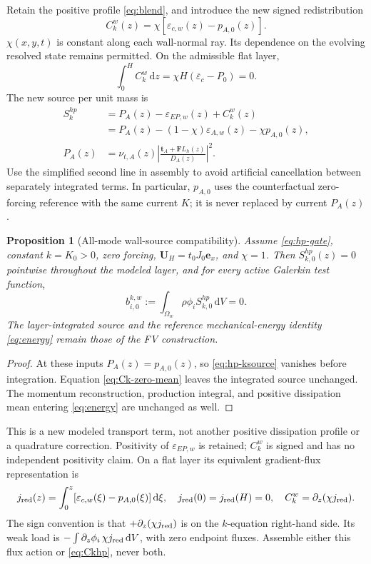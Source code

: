 \documentclass[11pt,a4paper]{article}
\numberwithin{equation}{section}
\newtheorem{proposition}{Proposition}[section]
\newcommand{\dd}{\mathrm{d}}
\newcommand{\eps}{\varepsilon}
\newcommand{\avg}[1]{\overline{#1}}
\newcommand{\EAw}{\eps_{A,w}}
\newcommand{\ECw}{\eps_{c,w}}
\newcommand{\EEP}{\eps_{EP,w}}
\begin{document}
Retain the positive profile \cref{eq:blend}, and introduce the new signed
redistribution
\begin{equation}
 \boxed{C_k^w(z)=\chi[\ECw(z)-p_{A,0}(z)].}
 \label{eq:Ckhp}
\end{equation}
$\chi(x,y,t)$ is constant along each wall-normal ray. Its dependence on
the evolving resolved state remains permitted. On the admissible flat
layer,
\begin{equation}
 \int_0^H C_k^w\,\dd z
 =\chi H(\avg\eps_c-P_0)=0.
 \label{eq:Ck-zero-mean}
\end{equation}
The new source per unit mass is
\begin{align}
 S_k^{hp}
 &=P_A(z)-\EEP(z)+C_k^w(z)\nonumber\\
 &=\boxed{P_A(z)-(1-\chi)\EAw(z)-\chi p_{A,0}(z)},
 \label{eq:hp-ksource}\\
 P_A(z)&=\nu_{t,A}(z)
   \left|\frac{\bm t_A+\bm F L_h(z)}{D_A(z)}\right|^2.
 \label{eq:PA-local}
\end{align}
Use the simplified second line in assembly to avoid artificial
cancellation between separately integrated terms. In particular,
$p_{A,0}$ uses the counterfactual zero-forcing reference with the same
current $K$; it is never replaced by current $P_A(z)$.

\begin{proposition}[All-mode wall-source compatibility]
Assume \cref{eq:hp-gate}, constant $k=K_0>0$, zero forcing,
$\bm U_H=t_0J_0\bm e_x$, and $\chi=1$. Then
$S_{k,0}^{hp}(z)=0$ pointwise throughout the modeled layer, and for
every active Galerkin test function,
\begin{equation}
 \boxed{b_{i,0}^{k,w}:=
 \int_{\Omega_w}\rho\phi_i S_{k,0}^{hp}\,\dd V=0.}
 \label{eq:hp-allmode}
\end{equation}
The layer-integrated source and the reference mechanical-energy
identity \cref{eq:energy} remain those of the FV construction.
\end{proposition}
\begin{proof}
At these inputs $P_A(z)=p_{A,0}(z)$, so \cref{eq:hp-ksource}
vanishes before integration. Equation \eqref{eq:Ck-zero-mean} leaves
the integrated source unchanged. The momentum reconstruction,
production integral, and positive dissipation mean entering
\cref{eq:energy} are unchanged as well.
\end{proof}

This is a new modeled transport term, not another positive dissipation
profile or a quadrature correction. Positivity of $\EEP$ is retained;
$C_k^w$ is signed and has no independent positivity claim. On a flat
layer its equivalent gradient-flux representation is
\begin{equation}
 j_{\rm red}(z)=\int_0^z[\ECw(\xi)-p_{A,0}(\xi)]\,\dd\xi,
 \quad j_{\rm red}(0)=j_{\rm red}(H)=0,
 \quad C_k^w=\partial_z(\chi j_{\rm red}).
 \label{eq:hp-red-flux}
\end{equation}
The sign convention is that $+\partial_z(\chi j_{\rm red})$ is on the
$k$-equation right-hand side. Its weak load is
$-\int\partial_z\phi_i\,\chi j_{\rm red}\,\dd V$, with zero endpoint
fluxes. Assemble either this flux action or \cref{eq:Ckhp}, never both.
\end{document}
